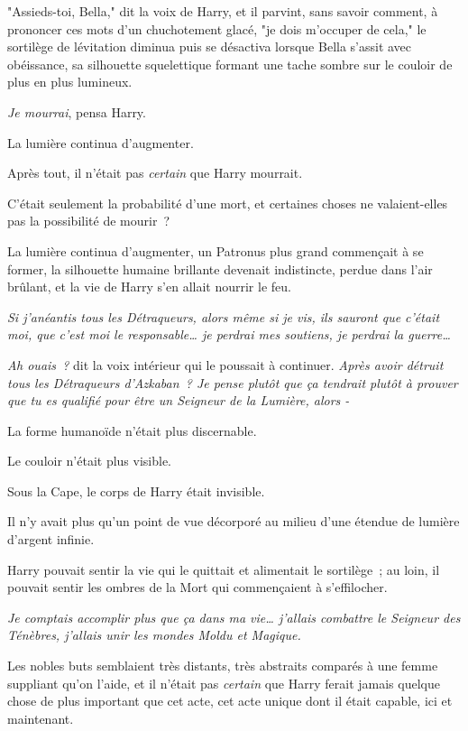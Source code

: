 "Assieds-toi, Bella," dit la voix de Harry, et il parvint, sans savoir comment, à prononcer ces mots d'un chuchotement glacé, "je dois m'occuper de cela," le sortilège de lévitation diminua puis se désactiva lorsque Bella s'assit avec obéissance, sa silhouette squelettique formant une tache sombre sur le couloir de plus en plus lumineux.

\emph{Je mourrai}, pensa Harry.

La lumière continua d'augmenter.

Après tout, il n'était pas \emph{certain} que Harry mourrait.

C'était seulement la probabilité d'une mort, et certaines choses ne valaient-elles pas la possibilité de mourir~?

La lumière continua d'augmenter, un Patronus plus grand commençait à se former, la silhouette humaine brillante devenait indistincte, perdue dans l'air brûlant, et la vie de Harry s'en allait nourrir le feu.

\emph{Si j'anéantis tous les Détraqueurs, alors même si je vis, ils sauront que c'était moi, que c'est moi le responsable… je perdrai mes soutiens, je perdrai la guerre…}

\emph{Ah ouais~?} dit la voix intérieur qui le poussait à continuer. \emph{Après avoir détruit tous les Détraqueurs d'Azkaban~? Je pense plutôt que ça tendrait plutôt à prouver que tu es qualifié pour être un Seigneur de la Lumière, alors  -}

La forme humanoïde n'était plus discernable.

Le couloir n'était plus visible.

Sous la Cape, le corps de Harry était invisible.

Il n'y avait plus qu'un point de vue décorporé au milieu d'une étendue de lumière d'argent infinie.

Harry pouvait sentir la vie qui le quittait et alimentait le sortilège~; au loin, il pouvait sentir les ombres de la Mort qui commençaient à s'effilocher.

\emph{Je comptais accomplir plus que ça dans ma vie… j'allais combattre le Seigneur des Ténèbres, j'allais unir les mondes Moldu et Magique.}

Les nobles buts semblaient très distants, très abstraits comparés à une femme suppliant qu'on l'aide, et il n'était pas \emph{certain} que Harry ferait jamais quelque chose de plus important que cet acte, cet acte unique dont il était capable, ici et maintenant.

